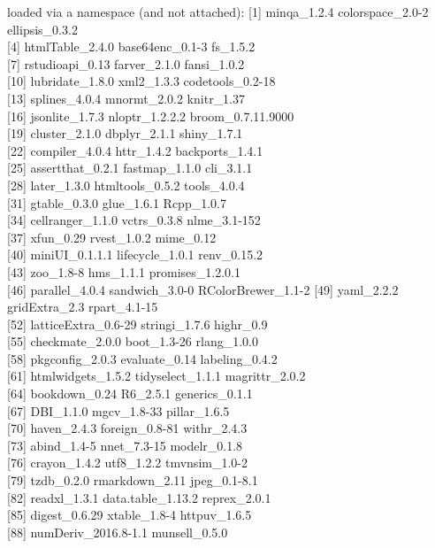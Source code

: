 \documentclass[
  english,
  man,floatsintext]{apa7}
\begin{document}
loaded via a namespace (and not attached):
{[}1{]} minqa\_1.2.4 colorspace\_2.0-2 ellipsis\_0.3.2\\
{[}4{]} htmlTable\_2.4.0 base64enc\_0.1-3 fs\_1.5.2\\
{[}7{]} rstudioapi\_0.13 farver\_2.1.0 fansi\_1.0.2\\
{[}10{]} lubridate\_1.8.0 xml2\_1.3.3 codetools\_0.2-18\\
{[}13{]} splines\_4.0.4 mnormt\_2.0.2 knitr\_1.37\\
{[}16{]} jsonlite\_1.7.3 nloptr\_1.2.2.2 broom\_0.7.11.9000\\
{[}19{]} cluster\_2.1.0 dbplyr\_2.1.1 shiny\_1.7.1\\
{[}22{]} compiler\_4.0.4 httr\_1.4.2 backports\_1.4.1\\
{[}25{]} assertthat\_0.2.1 fastmap\_1.1.0 cli\_3.1.1\\
{[}28{]} later\_1.3.0 htmltools\_0.5.2 tools\_4.0.4\\
{[}31{]} gtable\_0.3.0 glue\_1.6.1 Rcpp\_1.0.7\\
{[}34{]} cellranger\_1.1.0 vctrs\_0.3.8 nlme\_3.1-152\\
{[}37{]} xfun\_0.29 rvest\_1.0.2 mime\_0.12\\
{[}40{]} miniUI\_0.1.1.1 lifecycle\_1.0.1 renv\_0.15.2\\
{[}43{]} zoo\_1.8-8 hms\_1.1.1 promises\_1.2.0.1\\
{[}46{]} parallel\_4.0.4 sandwich\_3.0-0 RColorBrewer\_1.1-2
{[}49{]} yaml\_2.2.2 gridExtra\_2.3 rpart\_4.1-15\\
{[}52{]} latticeExtra\_0.6-29 stringi\_1.7.6 highr\_0.9\\
{[}55{]} checkmate\_2.0.0 boot\_1.3-26 rlang\_1.0.0\\
{[}58{]} pkgconfig\_2.0.3 evaluate\_0.14 labeling\_0.4.2\\
{[}61{]} htmlwidgets\_1.5.2 tidyselect\_1.1.1 magrittr\_2.0.2\\
{[}64{]} bookdown\_0.24 R6\_2.5.1 generics\_0.1.1\\
{[}67{]} DBI\_1.1.0 mgcv\_1.8-33 pillar\_1.6.5\\
{[}70{]} haven\_2.4.3 foreign\_0.8-81 withr\_2.4.3\\
{[}73{]} abind\_1.4-5 nnet\_7.3-15 modelr\_0.1.8\\
{[}76{]} crayon\_1.4.2 utf8\_1.2.2 tmvnsim\_1.0-2\\
{[}79{]} tzdb\_0.2.0 rmarkdown\_2.11 jpeg\_0.1-8.1\\
{[}82{]} readxl\_1.3.1 data.table\_1.13.2 reprex\_2.0.1\\
{[}85{]} digest\_0.6.29 xtable\_1.8-4 httpuv\_1.6.5\\
{[}88{]} numDeriv\_2016.8-1.1 munsell\_0.5.0\\
\end{document}
